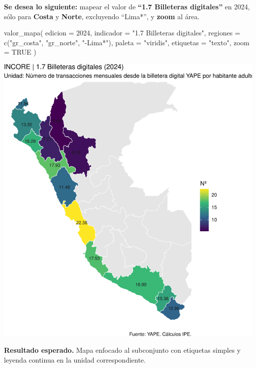 \documentclass[
  11pt,
  letterpaper,
  DIV=11,
  numbers=noendperiod]{scrartcl}
\newenvironment{Shaded}{\begin{snugshade}}{\end{snugshade}}
\newcommand{\AttributeTok}[1]{\textcolor[rgb]{0.40,0.45,0.13}{#1}}
\newcommand{\ConstantTok}[1]{\textcolor[rgb]{0.56,0.35,0.01}{#1}}
\newcommand{\DecValTok}[1]{\textcolor[rgb]{0.68,0.00,0.00}{#1}}
\newcommand{\FunctionTok}[1]{\textcolor[rgb]{0.28,0.35,0.67}{#1}}
\newcommand{\NormalTok}[1]{\textcolor[rgb]{0.00,0.23,0.31}{#1}}
\newcommand{\StringTok}[1]{\textcolor[rgb]{0.13,0.47,0.30}{#1}}
\begin{document}
\textbf{Se desea lo siguiente:} mapear el valor de \textbf{``1.7
Billeteras digitales''} en 2024, sólo para \textbf{Costa} y
\textbf{Norte}, excluyendo ``Lima*'', y \textbf{zoom} al área.

\begin{Shaded}
\begin{Highlighting}[]
\FunctionTok{valor\_mapa}\NormalTok{(}
  \AttributeTok{edicion   =} \DecValTok{2024}\NormalTok{,}
  \AttributeTok{indicador =} \StringTok{"1.7 Billeteras digitales"}\NormalTok{,}
  \AttributeTok{regiones  =} \FunctionTok{c}\NormalTok{(}\StringTok{"gr\_costa"}\NormalTok{, }\StringTok{"gr\_norte"}\NormalTok{, }\StringTok{"{-}Lima*"}\NormalTok{),}
  \AttributeTok{paleta    =} \StringTok{"viridis"}\NormalTok{,}
  \AttributeTok{etiquetas =} \StringTok{"texto"}\NormalTok{,}
  \AttributeTok{zoom      =} \ConstantTok{TRUE}
\NormalTok{)}
\end{Highlighting}
\end{Shaded}

\includegraphics{Manual_files/figure-pdf/unnamed-chunk-85-1.pdf}

\textbf{Resultado esperado.} Mapa enfocado al subconjunto con etiquetas
simples y leyenda continua en la unidad correspondiente.
\end{document}
